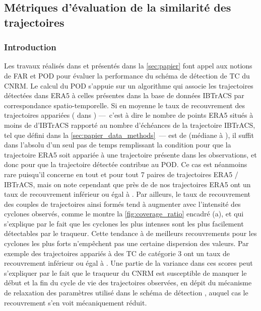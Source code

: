 \documentclass[../main.tex]{subfiles}
\begin{document}
\subsection{Métriques d'évaluation de la similarité des trajectoires}\label{sec:similarité}

\subsubsection*{Introduction}

Les travaux réalisés dans \textcite{dulac_assessing_2023} et présentés dans la \cref{sec:papier} font appel aux notions de FAR et POD pour évaluer la
performance du schéma de détection de TC du CNRM. Le calcul du POD s'appuie sur un algorithme qui associe les trajectoires détectées dans ERA5 à celles
présentes dans la base de données IBTrACS par correspondance spatio-temporelle. Si en moyenne le taux de recouvrement des trajectoires appariées
( dans \textcite{dulac_assessing_2023}) ---~c'est à dire le nombre de points ERA5 situés à moins de  d'IBTrACS rapporté au
nombre d'échéances de la trajectoire IBTrACS, tel que défini dans la \cref{sec:papier_data_methods}~--- est de  (médiane à ), il suffit dans
l'absolu d'un seul pas de temps remplissant la condition pour que la trajectoire ERA5 soit appariée à une trajectoire présente dans les observations, et donc
pour que la trajectoire détectée contribue au POD. Ce cas est néanmoins rare puisqu'il concerne en tout et pour tout \num{7} paires de trajectoires ERA5 /
IBTrACS, mais on note cependant que près de  de nos trajectoires ERA5 ont un taux de recouvrement inférieur ou égal à . Par ailleurs, le taux
de recouvrement des couples de trajectoires ainsi formés tend à augmenter avec l'intensité des cyclones observés, comme le montre la \cref{fig:coverage_ratio}
encadré (a), et qui s'explique par le fait que les cyclones les plus intenses sont les plus facilement détectables par le traqueur. Cette tendance à de
meilleurs recouvrements pour les cyclones les plus forts n'empêchent pas une certaine dispersion des valeurs. Par exemple  des trajectoires appariés à
des TC de catégorie \num{3} ont un taux de recouvrement inférieur ou égal à . Une partie de la variance dans ces scores peut s'expliquer par le fait
que le traqueur du CNRM est susceptible de manquer le début et la fin du cycle de vie des trajectoires observées, en dépit du mécanisme de relaxation des
paramètres utilisé dans le schéma de détection \parencite[][Figure 8]{bourdin_intercomparison_2022}, auquel cas le recouvrement s'en voit mécaniquement réduit.
\end{document}
